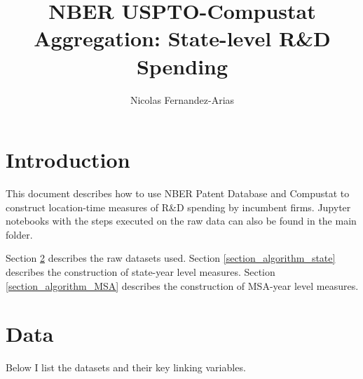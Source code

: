 \documentclass[12pt,english]{article}
\theoremstyle{remark}
\begin{document}
	
	\title{NBER USPTO-Compustat Aggregation: State-level R\&D Spending}
	\author{Nicolas Fernandez-Arias}
	\maketitle

\section{Introduction}

This document describes how to use NBER Patent Database and Compustat to construct location-time measures of R\&D spending by incumbent firms. Jupyter notebooks with the steps executed on the raw data can also be found in the main folder. 

Section \ref{section_data} describes the raw datasets used. Section \ref{section_algorithm_state} describes the construction of state-year level measures. Section \ref{section_algorithm_MSA} describes the construction of MSA-year level measures. 


\section{Data}\label{section_data}
Below I list the datasets and their key linking variables.
\end{document}
